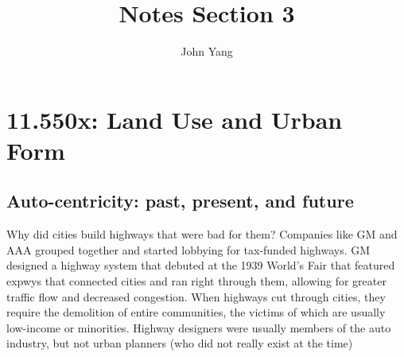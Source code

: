 \documentclass{article}
\title{Notes Section 3} %
\author{John Yang}
\begin{document}
    \maketitle
    \tableofcontents
    \section{11.550x: Land Use and Urban Form}
    \subsection{Auto-centricity: past, present, and future}
    \begin{outline}
        \1 Why did cities build highways that were bad for them?
            \2 Companies like GM and AAA grouped together and started lobbying for tax-funded highways. 
            \2 GM designed a highway system that debuted at the 1939 World's Fair that featured expwys that connected cities and ran right through them, allowing for greater traffic flow and decreased congestion. 
            \2 When highways cut through cities, they require the demolition of entire communities, the victims of which are usually low-income or minorities. 
            \2 Highway designers were usually members of the auto industry, but not urban planners (who did not really exist at the time)
            
    \end{outline}
\end{document}
